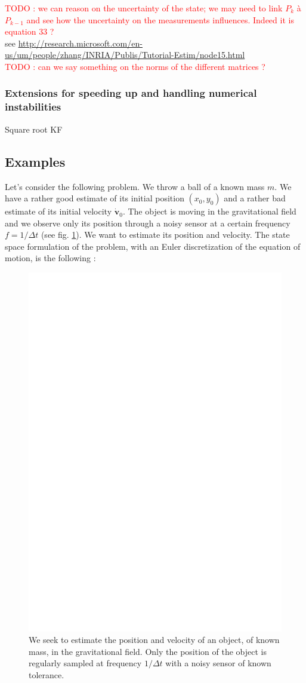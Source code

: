 \documentclass[10pt,oneside]{scrartcl}
\newcommand\vecteur[1]{\boldsymbol#1}
\begin{document}
\textcolor{red}{TODO : we can reason on the uncertainty of the state; we may need to link $P_k$ à $P_{k-1}$ and see how the uncertainty on the measurements influences. Indeed it is equation 33 ?}\\

see \url{http://research.microsoft.com/en-us/um/people/zhang/INRIA/Publis/Tutorial-Estim/node15.html}\\

\textcolor{red}{TODO : can we say something on the norms of the different matrices ?}\\

\subsubsection{Extensions for speeding up and handling numerical
  instabilities}

\textcolor{rouge}{Square root KF}\\

\subsection{Examples}

Let's consider the following problem. We throw a ball of a known mass
$m$. We have a rather good estimate of its initial position
$(x_0,y_0)$ and a rather bad estimate of its initial velocity
$\dot{\vecteur{v}}_0$. The object is moving in the gravitational field
and we observe only its position through a noisy sensor at a certain
frequency $f = 1/\Delta t$ (see fig. \ref{fig:KF_ex1}). We want to estimate its position and
velocity. The state space formulation of the problem, with an Euler
discretization of the equation of motion, is the following :

\begin{figure}[htbp]
\center \includegraphics[width=0.5\linewidth]{eps/KF-ex1.eps}
\caption{\label{fig:KF_ex1} We seek to estimate the position and
  velocity of an object, of known mass, in the gravitational
  field. Only the position of the object is regularly sampled at
  frequency $1/\Delta t$ with a noisy sensor of known tolerance.}
\end{figure}
\end{document}

